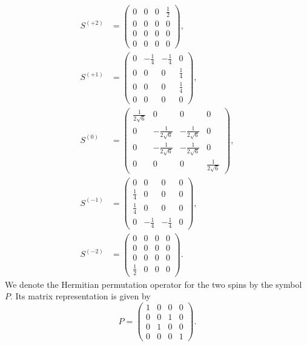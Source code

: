 	\begin{align}
	\label{Eq:repr_S2}
	{S^{( + 2)}} &= \left( {\begin{array}{*{20}{c}}
  0&0&0&{\frac{1}{2}} \\ 
  0&0&0&0 \\ 
  0&0&0&0 \\ 
  0&0&0&0 
\end{array}} \right), \\
	\label{Eq:repr_S1}
	{S^{( + 1)}} &= \left( {\begin{array}{*{20}{c}}
  0&{ - \frac{1}{4}}&{ - \frac{1}{4}}&0 \\ 
  0&0&0&{\frac{1}{4}} \\ 
  0&0&0&{\frac{1}{4}} \\ 
  0&0&0&0 
\end{array}} \right), \\
	\label{Eq:repr_S0}
	{S^{(0)}} &= \left( {\begin{array}{*{20}{c}}
  {\frac{1}{{2\sqrt 6 }}}&0&0&0 \\ 
  0&{ - \frac{1}{{2\sqrt 6 }}}&{ - \frac{1}{{2\sqrt 6 }}}&0 \\ 
  0&{ - \frac{1}{{2\sqrt 6 }}}&{ - \frac{1}{{2\sqrt 6 }}}&0 \\ 
  0&0&0&{\frac{1}{{2\sqrt 6 }}} 
\end{array}} \right), \\
	\label{Eq:repr_S-1}
	{S^{( - 1)}} &= \left( {\begin{array}{*{20}{c}}
  0&0&0&0 \\ 
  {\frac{1}{4}}&0&0&0 \\ 
  {\frac{1}{4}}&0&0&0 \\ 
  0&{ - \frac{1}{4}}&{ - \frac{1}{4}}&0 
\end{array}} \right), \\
	\label{Eq:repr_S-2}
	{S^{( - 2)}} &= \left( {\begin{array}{*{20}{c}}
  0&0&0&0 \\ 
  0&0&0&0 \\ 
  0&0&0&0 \\ 
  {\frac{1}{2}}&0&0&0 
\end{array}} \right).
\end{align} 	
We denote the Hermitian permutation operator for the two spins by the symbol $P$. Its matrix representation is given by
	\begin{equation}
	P = \left( {\begin{array}{*{20}{c}}
  1&0&0&0 \\ 
  0&0&1&0 \\ 
  0&1&0&0 \\ 
  0&0&0&1 
\end{array}} \right).
\end{equation} 	
